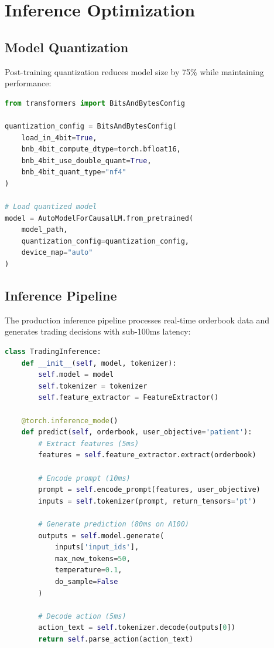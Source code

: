\documentclass{report}
\begin{document}
\section{Inference Optimization}

\subsection{Model Quantization}

Post-training quantization reduces model size by 75\% while maintaining performance:

\begin{lstlisting}[language=Python, caption=4-bit quantization implementation]
from transformers import BitsAndBytesConfig

quantization_config = BitsAndBytesConfig(
    load_in_4bit=True,
    bnb_4bit_compute_dtype=torch.bfloat16,
    bnb_4bit_use_double_quant=True,
    bnb_4bit_quant_type="nf4"
)

# Load quantized model
model = AutoModelForCausalLM.from_pretrained(
    model_path,
    quantization_config=quantization_config,
    device_map="auto"
)
\end{lstlisting}

\subsection{Inference Pipeline}

The production inference pipeline processes real-time orderbook data and generates trading decisions with sub-100ms latency:

\begin{lstlisting}[language=Python, caption=Real-time inference pipeline]
class TradingInference:
    def __init__(self, model, tokenizer):
        self.model = model
        self.tokenizer = tokenizer
        self.feature_extractor = FeatureExtractor()
        
    @torch.inference_mode()
    def predict(self, orderbook, user_objective='patient'):
        # Extract features (5ms)
        features = self.feature_extractor.extract(orderbook)
        
        # Encode prompt (10ms)
        prompt = self.encode_prompt(features, user_objective)
        inputs = self.tokenizer(prompt, return_tensors='pt')
        
        # Generate prediction (80ms on A100)
        outputs = self.model.generate(
            inputs['input_ids'],
            max_new_tokens=50,
            temperature=0.1,
            do_sample=False
        )
        
        # Decode action (5ms)
        action_text = self.tokenizer.decode(outputs[0])
        return self.parse_action(action_text)
\end{lstlisting}
\end{document}
